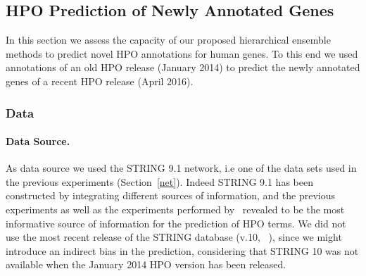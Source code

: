 \documentclass{bioinfo}
\newcommand{\htd}{{\em HTD}}
\newcommand{\tpr}{{\em TPR}}
\begin{document}
\subsection{HPO Prediction of Newly Annotated Genes}
\label{expII}
In this section we assess the capacity of our proposed hierarchical ensemble methods to predict novel HPO annotations for human genes. To this end we used annotations of an old HPO release (January 2014) to predict the newly annotated genes of a recent HPO release (April 2016).



\subsubsection{Data}
\label{data2}
\paragraph{Data Source.}
As data source we used the STRING 9.1 network, i.e one of the data sets used in the previous experiments (Section~\ref{net}).
Indeed STRING 9.1 has been constructed by integrating different sources of information, and the previous experiments as well as the experiments performed by~\citet{PHENO15} revealed to be the most informative source of information for the prediction of HPO terms.
We did not use the most recent release of the STRING database (v.10, ~\citet{String10}), since we might introduce an indirect bias in the prediction, considering that  STRING 10 was not available when the January 2014 HPO version has been released.  

 
\end{document}
